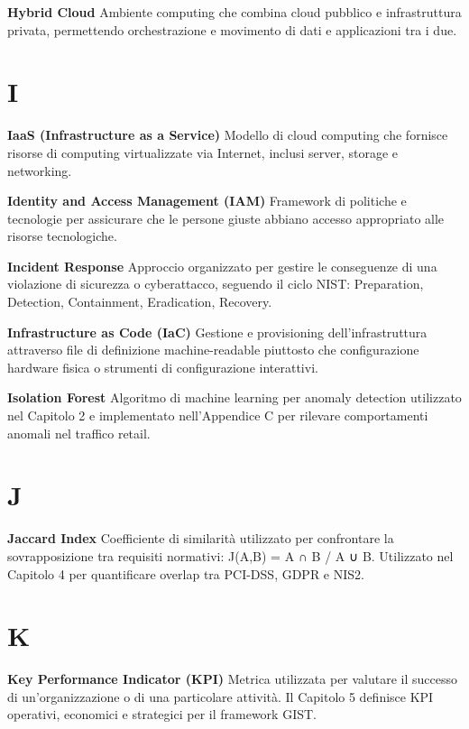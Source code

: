 \documentclass[12pt,a4paper,oneside]{book}
\numberwithin{figure}{chapter} %
\numberwithin{table}{chapter}  %
\begin{document}
\textbf{Hybrid Cloud} Ambiente computing che combina cloud pubblico e
infrastruttura privata, permettendo orchestrazione e movimento di dati e
applicazioni tra i due.

\section{I}\label{i}

\textbf{IaaS (Infrastructure as a Service)} Modello di cloud computing
che fornisce risorse di computing virtualizzate via Internet, inclusi
server, storage e networking.

\textbf{Identity and Access Management (IAM)} Framework di politiche e
tecnologie per assicurare che le persone giuste abbiano accesso
appropriato alle risorse tecnologiche.

\textbf{Incident Response} Approccio organizzato per gestire le
conseguenze di una violazione di sicurezza o cyberattacco, seguendo il
ciclo NIST: Preparation, Detection, Containment, Eradication, Recovery.

\textbf{Infrastructure as Code (IaC)} Gestione e provisioning
dell'infrastruttura attraverso file di definizione machine-readable
piuttosto che configurazione hardware fisica o strumenti di
configurazione interattivi.

\textbf{Isolation Forest} Algoritmo di machine learning per anomaly
detection utilizzato nel Capitolo 2 e implementato nell'Appendice C per
rilevare comportamenti anomali nel traffico retail.

\section{J}\label{j}

\textbf{Jaccard Index} Coefficiente di similarità utilizzato per
confrontare la sovrapposizione tra requisiti normativi: J(A,B) =
\textbar A ∩ B\textbar{} / \textbar A ∪ B\textbar. Utilizzato nel
Capitolo 4 per quantificare overlap tra PCI-DSS, GDPR e NIS2.

\section{K}\label{k}

\textbf{Key Performance Indicator (KPI)} Metrica utilizzata per valutare
il successo di un'organizzazione o di una particolare attività. Il
Capitolo 5 definisce KPI operativi, economici e strategici per il
framework GIST.
\end{document}
